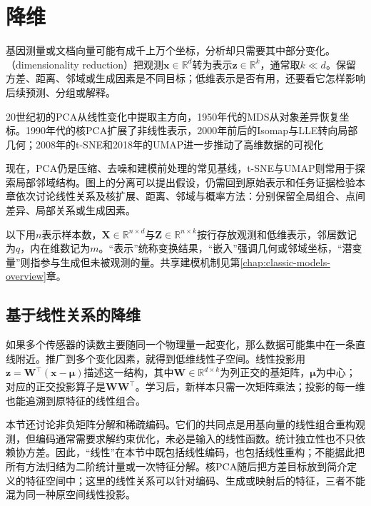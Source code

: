 \chapter{降维}
\label{chap:dimensionality-reduction}

基因测量或文档向量可能有成千上万个坐标，分析却只需要其中部分变化。（dimensionality reduction）把观测$\bm{x}\in\mathbb{R}^{d}$转为表示$\bm{z}\in\mathbb{R}^{k}$，通常取$k\ll d$。保留方差、距离、邻域或生成因素是不同目标；低维表示是否有用，还要看它怎样影响后续预测、分组或解释。

20世纪初的PCA从线性变化中提取主方向，1950年代的MDS从对象差异恢复坐标。1990年代的核PCA扩展了非线性表示，2000年前后的Isomap与LLE转向局部几何；2008年的t-SNE和2018年的UMAP进一步推动了高维数据的可视化

现在，PCA仍是压缩、去噪和建模前处理的常见基线，t-SNE与UMAP则常用于探索局部邻域结构。图上的分离可以提出假设，仍需回到原始表示和任务证据检验本章依次讨论线性关系及核扩展、距离、邻域与概率方法：分别保留全局组合、点间差异、局部关系或生成因素。

以下用$n$表示样本数，$\bm{X}\in\mathbb{R}^{n\times d}$与$\bm{Z}\in\mathbb{R}^{n\times k}$按行存放观测和低维表示，邻居数记为$q$，内在维数记为$m$。“表示”统称变换结果，“嵌入”强调几何或邻域坐标，“潜变量”则指参与生成但未被观测的量。共享建模机制见第\ref{chap:classic-models-overview}章。

\section{基于线性关系的降维}
\label{sec:dim-linear}

如果多个传感器的读数主要随同一个物理量一起变化，那么数据可能集中在一条直线附近。推广到多个变化因素，就得到低维线性子空间。线性投影用$\bm{z}=\bm{W}^{\top}(\bm{x}-\bm{\mu})$描述这一结构，其中$\bm{W}\in\mathbb{R}^{d\times k}$为列正交的基矩阵，$\bm{\mu}$为中心；对应的正交投影算子是$\bm{W}\bm{W}^{\top}$。学习后，新样本只需一次矩阵乘法；投影的每一维也能追溯到原特征的线性组合。

本节还讨论非负矩阵分解和稀疏编码。它们的共同点是用基向量的线性组合重构观测，但编码通常需要求解约束优化，未必是输入的线性函数。统计独立性也不只依赖协方差。因此，“线性”在本节中既包括线性编码，也包括线性重构；不能据此把所有方法归结为二阶统计量或一次特征分解。核PCA随后把方差目标放到简介定义的特征空间中；这里的线性关系可以针对编码、生成或映射后的特征，三者不能混为同一种原空间线性投影。

